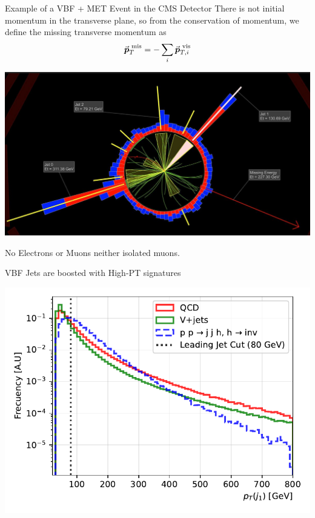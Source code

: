 \documentclass{../../bredelebeamer}
\begin{document}
\begin{frame}{Example of a VBF + MET Event in the CMS Detector}
    There is not initial momentum in the transverse plane, so from the conservation of momentum, we define the missing transverse momentum as
    $$
        \va*{p}_T^{\text{ mis}} = - \sum_{i} \va*{p}_{T,i}^{\text{ vis}}
    $$
    \begin{center}
        \includegraphics[width=.95\linewidth]{../Images/real_vbf_event.png}
    \end{center}
    No Electrons or Muons neither isolated muons. 
\end{frame}

\begin{frame}{VBF Jets are boosted with High-PT signatures}
    \begin{minipage}{0.97\textwidth}
        \includegraphics[width=\textwidth]{../Images/leading_jet_pt_comparison.pdf}
    \end{minipage}
\end{frame}
\end{document}
